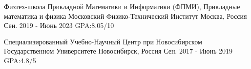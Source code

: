 

\begin{cventries}


  \cventry
  {Физтех-школа Прикладной Математики и Информатики (ФПМИ), Прикладные математика и физика} %
  {Московский Физико-Технический Институт} %
  {Москва, Россия} %
  {Сен. 2019 - Июнь 2023} %
  {
    GPA:8.05/10
  }

  \cventry
  {} %
  {Специализированный Учебно-Научный Центр при Новосибирском Государственном Университете} %
  {Новосибирск, Россия} %
  {Сен. 2017 - Июнь 2019} %
  {
    GPA:4.8/5
  }



\end{cventries}
